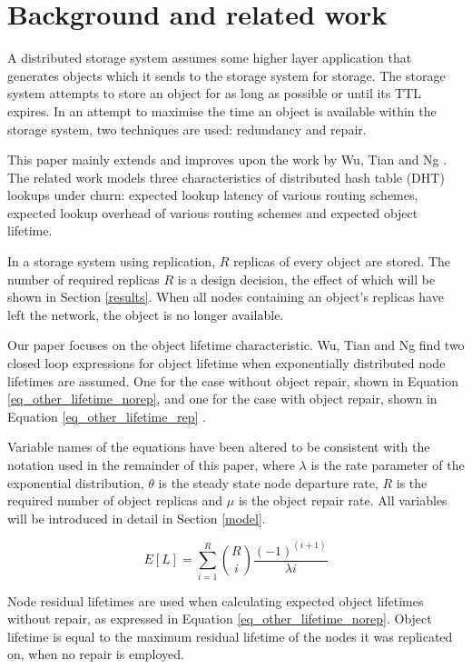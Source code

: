 \documentclass[10pt,a4paper,conference]{IEEEtran}
\begin{document}
\section{Background and related work}
\label{related_work}

A distributed storage system assumes some higher layer application that generates objects which it sends to the storage system for storage. The storage system attempts to store an object for as long as possible or until its TTL expires. In an attempt to maximise the time an object is available within the storage system, two techniques are used: redundancy and repair.

This paper mainly extends and improves upon the work by Wu, Tian and Ng \cite{replication_article}. The related work models three characteristics of distributed hash table (DHT) lookups under churn: expected lookup latency of various routing schemes, expected lookup overhead of various routing schemes and expected object lifetime.

In a storage system using replication, $R$ replicas of every object are stored. The number of required replicas $R$ is a design decision, the effect of which will be shown in Section \ref{results}. When all nodes containing an object's replicas have left the network, the object is no longer available.


Our paper focuses on the object lifetime characteristic. Wu, Tian and Ng find two closed loop expressions for object lifetime when exponentially distributed node lifetimes are assumed. One for the case without object repair, shown in Equation \eqref{eq_other_lifetime_norep}, and one for the case with object repair, shown in Equation \eqref{eq_other_lifetime_rep} \cite{replication_article}.

Variable names of the equations have been altered to be consistent with the notation used in the remainder of this paper, where $\lambda$ is the rate parameter of the exponential distribution, $\theta$ is the steady state node departure rate, $R$ is the required number of object replicas and $\mu$ is the object repair rate. All variables will be introduced in detail in Section \ref{model}.

\begin{equation} \label{eq_other_lifetime_norep}
    E[L] = \sum_{i = 1}^{R}{{R}\choose{i}}\frac{(-1)^{(i+1)}}{\lambda i}
\end{equation}

Node residual lifetimes are used when calculating expected object lifetimes without repair, as expressed in Equation \eqref{eq_other_lifetime_norep}.
Object lifetime is equal to the maximum residual lifetime of the nodes it was replicated on, when no repair is employed.
\end{document}
